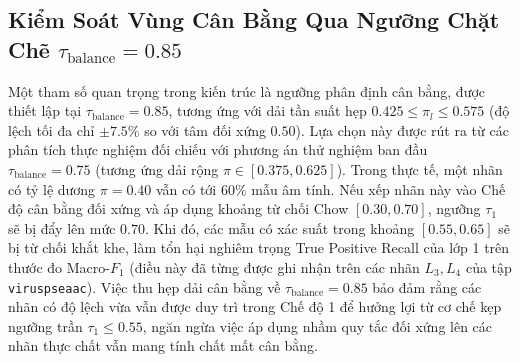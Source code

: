 \documentclass[10pt,a4paper,twoside]{article}
\begin{document}
\subsection{Kiểm Soát Vùng Cân Bằng Qua Ngưỡng Chặt Chẽ \texorpdfstring{$\tau_{\text{balance}} = 0.85$}{tau_balance = 0.85}}
Một tham số quan trọng trong kiến trúc là ngưỡng phân định cân bằng, được thiết lập tại $\tau_{\text{balance}} = 0.85$, tương ứng với dải tần suất hẹp $0.425 \le \pi_l \le 0.575$ (độ lệch tối đa chỉ $\pm 7.5\%$ so với tâm đối xứng $0.50$).
Lựa chọn này được rút ra từ các phân tích thực nghiệm đối chiếu với phương án thử nghiệm ban đầu $\tau_{\text{balance}} = 0.75$ (tương ứng dải rộng $\pi \in [0.375, 0.625]$). Trong thực tế, một nhãn có tỷ lệ dương $\pi = 0.40$ vẫn có tới $60\%$ mẫu âm tính. Nếu xếp nhãn này vào Chế độ cân bằng đối xứng và áp dụng khoảng từ chối Chow $[0.30, 0.70]$, ngưỡng $\tau_1$ sẽ bị đẩy lên mức $0.70$. Khi đó, các mẫu có xác suất trong khoảng $[0.55, 0.65]$ sẽ bị từ chối khắt khe, làm tổn hại nghiêm trọng True Positive Recall của lớp 1 trên thước đo Macro-$F_1$ (điều này đã từng được ghi nhận trên các nhãn $L_3, L_4$ của tập \texttt{viruspseaac}). Việc thu hẹp dải cân bằng về $\tau_{\text{balance}} = 0.85$ bảo đảm rằng các nhãn có độ lệch vừa vẫn được duy trì trong Chế độ 1 để hưởng lợi từ cơ chế kẹp ngưỡng trần $\tau_1 \le 0.55$, ngăn ngừa việc áp dụng nhầm quy tắc đối xứng lên các nhãn thực chất vẫn mang tính chất mất cân bằng.
\end{document}

